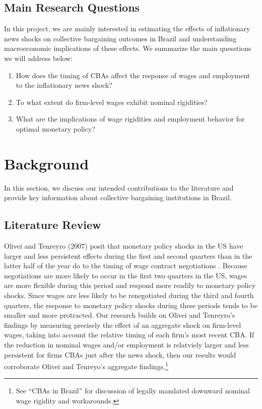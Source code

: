 \documentclass[12pt]{article}
\begin{document}
		\subsection{Main Research Questions}
		In this project, we are mainly interested in estimating the effects of inflationary news shocks on collective bargaining outcomes in Brazil and understanding macroeconomic implications of these effects. We summarize the main quesstions we will address below:  
		\begin{enumerate}
			\item How does the timing of CBAs affect the response of wages and employment to the inflationary news shock?

			\item To what extent do firm-level wages exhibit nominal rigidities?

			\item What are the implications of wage rigidities and employment behavior for optimal monetary policy?
		\end{enumerate}
	\section{Background}
	In this section, we discuss our intended contributions to the literature and provide key information about collective bargaining institutions in Brazil.
		\subsection{Literature Review}
		Olivei and Tenreyro (2007) posit that monetary policy shocks in the US have larger and less persistent effects during the first and second quarters than in the latter half of the year do to the timing of wage contract negotiations \cite{oliveiTimingMonetaryPolicy2007}. Because negotiations are more likely to occur in the first two quarters in the US, wages are more flexible during this period and respond more readily to monetary policy shocks. Since wages are less likely to be renegotiated during the third and fourth quarters, the response to monetary policy shocks during these periods tends to be smaller and more protracted. Our research builds on Olivei and Tenreyro's findings by measuring precisely the effect of an aggregate shock on firm-level wages, taking into account the relative timing of each firm's most recent CBA. If the reduction in nominal wages and/or employment is relatviely larger and less persistent for firms CBAs just after the news shock, then our results would corroborate Olivei and Tenreyo's aggregate findings.\footnote{See ``CBAs in Brazil'' for discussion of legally mandated downward nominal wage rigidity and workarounds.}
\end{document}
